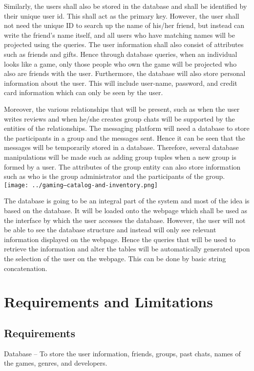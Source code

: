 \documentclass{article}
\begin{document}
Similarly, the users shall also be stored in the database and shall be identified by their unique user id. This shall act as the primary key. However, the user shall not need the unique ID to search up the name of his/her friend, but instead can write the friend’s name itself, and all users who have matching names will be projected using the queries. The user information shall also consist of attributes such as friends and gifts. Hence through database queries, when an individual looks like a game, only those people who own the game will be projected who also are friends with the user. Furthermore, the database will also store personal information about the user. This will include user-name, password, and credit card information which can only be seen by the user.


Moreover, the various relationships that will be present, such as when the user writes reviews and when he/she creates group chats will be supported by the entities of the relationships. The messaging platform will need a database to store the participants in a group and the messages sent. Hence it can be seen that the messages will be temporarily stored in a database. Therefore, several database manipulations will be made such as adding group tuples when a new group is formed by a user. The attributes of the group entity can also store information such as who is the group administrator and the participants of the group.
{\texttt{[image: ../gaming---catalog-and-inventory.png]} } 


The database is going to be an integral part of the system and most of the idea is based on the database. It will be loaded onto the webpage which shall be used as the interface by which the user accesses the database. However, the user will not be able to see the database structure and instead will only see relevant information displayed on the webpage. Hence the queries that will be used to retrieve the information and alter the tables will be automatically generated upon the selection of the user on the webpage. This can be done by basic string concatenation.

 \section{Requirements and Limitations}
 \subsection{Requirements}
 Database – To store the user information, friends, groups, past chats, names of the games, genres, and developers.
\end{document}
